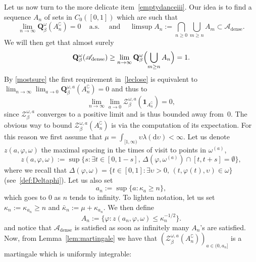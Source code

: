 \documentclass[10pt]{amsart}
\let\mathcal\mathscr
\let\sep:
\theoremstyle{definition}
\newcommand{\dd}{\mathrm{d}}
\newcommand{\ind}{\mathbf{1}}
\let\cc\complement
\newcommand{\cA}{{\ensuremath{\mathcal A}} }
\newcommand{\cZ}{{\ensuremath{\mathcal Z}} }
\newcommand{\bQ}{{\ensuremath{\mathbf Q}} }
\let\gb\beta
\let\gl\lambda
\let\ups\upsilon
\let\go\omega
\begin{document}
Let us now turn to the more delicate item~\eqref{emptydanceiii}.
Our idea is to find a sequence $A_{n}$ of sets in $C_0([0,1])$ which are such that
\begin{equation}\label{leclose}
\lim_{n\to\infty} \bQ^{\go}_{\gb}(A_n^{\cc}) =0 \, \quad \text{a.s.} \quad
\text{ and } \quad
\limsup A_{n} := \bigcap_{n\ge 0} \bigcup_{m\ge n} A_m\subset \cA_{\mathrm{dense}}.
\end{equation}
We will then get that almost surely
\begin{equation}
\bQ^{\go}_\beta (\cA_{\mathrm{dense}})\ge \lim_{n\to \infty } \bQ^{\go}_\beta \Bigl(\bigcup_{m\ge n} A_{n}\Bigr)=1.
\end{equation}
By \eqref{mostsure} the first requirement in~\eqref{leclose} is equivalent to
$\lim_{n\to\infty} \lim_{a\to 0} \bQ^{\go,a}_\beta (A^{\cc}_{n}) =0$
and thus to
\begin{equation}
\label{Zan}
\lim_{n\to\infty} \lim_{a\to 0} \cZ^{\go,a}_\beta (\ind_{A^{\cc}_{n}}) =0,
\end{equation}
since $\cZ^{\go,a}_\beta$
converges to a positive limit and is thus bounded away from~$0$.
The obvious way to bound $\cZ^{\go,a}_\beta (A^{\cc}_{n})$ is via the computation of its expectation. For this reason we first assume
that $\mu=\int_{[1,\infty)}\ups \gl (\dd \ups)<\infty$. Let
us denote $z(a,\varphi,\go)$ the maximal spacing in the times of visit to points in $\go^{(a)}$, \ie 
\begin{equation*}
z(a,\varphi,\go):= \sup \bigl\{ s \sep \exists t\in [0,1-s], \, \varDelta(\varphi,\go^{(a)})\cap[t,t+s]=\emptyset\bigr\},
\end{equation*}
where we recall that $\varDelta (\varphi, \go) = \{t\in [0,1] \sep \exists \ups>0,\, (t,\varphi(t),\ups) \in \go\} $ (see~\eqref{def:Deltaphi}).
Let us also set
\begin{equation*}
a_n:= \sup \{ a \sep \kappa_a \ge n \},
\end{equation*}
which goes to $0$ as $n$ tends to infinity.
To lighten notation, let us set $ \kappa_n:= \kappa_{a_n} \geq n$ and $\bar \kappa_n:= \mu+ \kappa_{a_n}$.
We then define
\begin{equation}
A_{n}:= \bigl\{ \varphi \sep z(a_n,\varphi,\go) \le \kappa_n^{-1/2} \bigr\}.
\end{equation}
and notice that $\cA_{\mathrm{dense}}$ is satisfied as soon as infinitely many $A_{n}$'s are satisfied. Now, from Lemma~\ref{lem:martingale} we have that $(\cZ^{\go, a }_{\beta}(A_{n}^{\cc}))_{a\in(0,a_n]}$ is a martingale which is uniformly integrable:
\end{document}
